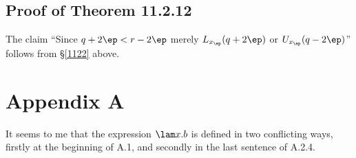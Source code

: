 \documentclass[12pt]{article}
\begin{document}
\subsection{Proof of Theorem 11.2.12}

The claim ``Since $q+2\ep<r-2\ep$ merely $L_{x_\ep}(q+2\ep)$ or $U_{x_\ep}(q-2\ep)$'' follows from \S\ref{1122} above.


\section{Appendix A}

It seems to me that the expression $\lam x.b$ is defined in two conflicting ways, firstly at the beginning of A.1, and secondly in the last sentence of A.2.4. 
\end{document}
